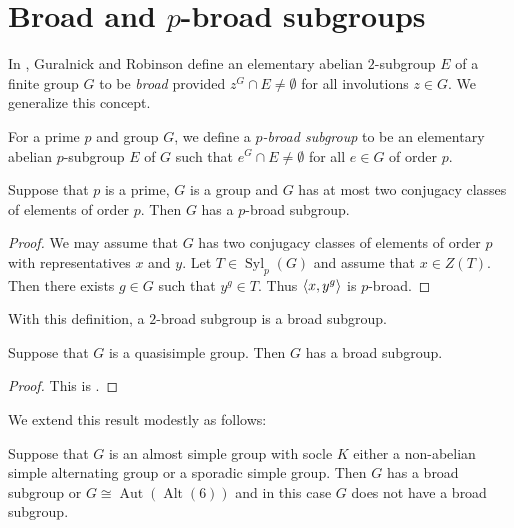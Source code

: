 \documentclass[12pt,a4paper]{amsart}
\DeclareMathOperator{\Aut}{Aut}
\DeclareMathOperator{\Syl}{Syl}
\DeclareMathOperator{\Alt}{Alt}
\DeclarePairedDelimiter{\gen}{\langle}{\rangle}
\begin{document}
\section{Broad   and $p$-broad subgroups}\label{sec:3}

In \cite{GuralnickRobinson1}, Guralnick and Robinson define an elementary abelian $2$-subgroup $E$ of a finite group $G$ to be \emph{broad} provided $z^G\cap E \not=\emptyset$ for all involutions $z\in G$. We generalize this concept.

 \begin{definition}\label{def:pbroad} For a prime $p$ and group $G$, we define a \emph{$p$-broad subgroup} to be an elementary abelian $p$-subgroup $E$ of $G$ such that $e^G \cap E\ne \emptyset$ for all $e \in G$ of order $p$.
\end{definition}

\begin{lemma}\label{lem:2 class broad}
Suppose that $p$ is a prime, $G$ is a group and $G$ has at most two conjugacy classes of elements of order $p$. Then $G$ has a $p$-broad subgroup.
\end{lemma}

\begin{proof} We may assume that $G$ has two conjugacy classes of elements of order $p$ with representatives $x$ and $y$.  Let $T \in \Syl_p(G)$   and assume that $x\in Z(T)$. Then there exists $g \in G$ such that $y^g \in T$. Thus $\gen{x,y^g}$ is $p$-broad.
\end{proof}

With this definition, a $2$-broad subgroup is a broad subgroup.


\begin{theorem}\label{GR} Suppose that $G$ is a quasisimple group. Then $G$ has a broad subgroup.
\end{theorem}
\begin{proof}  This is \cite[Theorem 1]{GuralnickRobinson1}.\end{proof}


We extend this result modestly as follows:
\begin{lemma}\label{lem:Broad}
Suppose that $G$ is an almost simple group with socle $K$ either a non-abelian simple alternating group or a sporadic simple group. Then $G$ has a broad subgroup or $G \cong \Aut(\Alt(6))$ and in this case $G$ does not have a broad subgroup.
\end{lemma}
\end{document}
